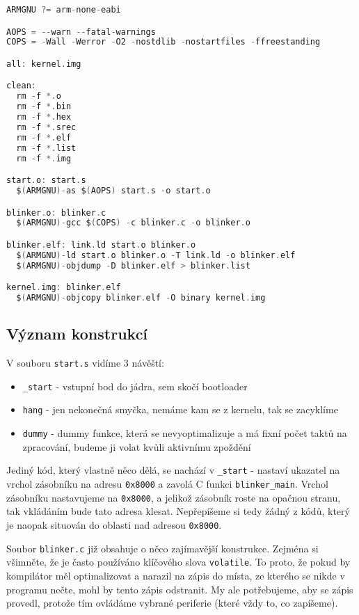 \documentclass{article}
\begin{document}
\begin{lstlisting}[language=C]
ARMGNU ?= arm-none-eabi

AOPS = --warn --fatal-warnings
COPS = -Wall -Werror -O2 -nostdlib -nostartfiles -ffreestanding

all: kernel.img

clean:
  rm -f *.o
  rm -f *.bin
  rm -f *.hex
  rm -f *.srec
  rm -f *.elf
  rm -f *.list
  rm -f *.img

start.o: start.s
  $(ARMGNU)-as $(AOPS) start.s -o start.o

blinker.o: blinker.c
  $(ARMGNU)-gcc $(COPS) -c blinker.c -o blinker.o

blinker.elf: link.ld start.o blinker.o
  $(ARMGNU)-ld start.o blinker.o -T link.ld -o blinker.elf
  $(ARMGNU)-objdump -D blinker.elf > blinker.list

kernel.img: blinker.elf
  $(ARMGNU)-objcopy blinker.elf -O binary kernel.img
\end{lstlisting}

\subsection{Význam konstrukcí}

V souboru \texttt{start.s} vidíme 3 návěští:
\begin{itemize}
	\item \texttt{\_start} - vstupní bod do jádra, sem skočí bootloader
	\item \texttt{hang} - jen nekonečná smyčka, nemáme kam se  z kernelu, tak se zacyklíme
	\item \texttt{dummy} - dummy funkce, která se nevyoptimalizuje a má fixní počet taktů na zpracování, budeme ji volat kvůli aktivnímu zpoždění
\end{itemize}

Jediný kód, který vlastně něco dělá, se nachází v \texttt{\_start} - nastaví ukazatel na vrchol zásobníku na adresu \texttt{0x8000} a zavolá C funkci \texttt{blinker\_main}. Vrchol zásobníku nastavujeme na \texttt{0x8000}, a jelikož zásobník roste na opačnou stranu, tak vkládáním bude tato adresa klesat. Nepřepíšeme si tedy žádný z kódů, který je naopak situován do oblasti nad adresou \texttt{0x8000}.

Soubor \texttt{blinker.c} již obsahuje o něco zajímavější konstrukce. Zejména si všimněte, že je často používáno klíčového slova \texttt{volatile}. To proto, že pokud by kompilátor měl optimalizovat a narazil na zápis do místa, ze kterého se nikde v programu nečte, mohl by tento zápis odstranit. My ale potřebujeme, aby se zápis provedl, protože tím ovládáme vybrané periferie (které  vždy to, co zapíšeme).
\end{document}
